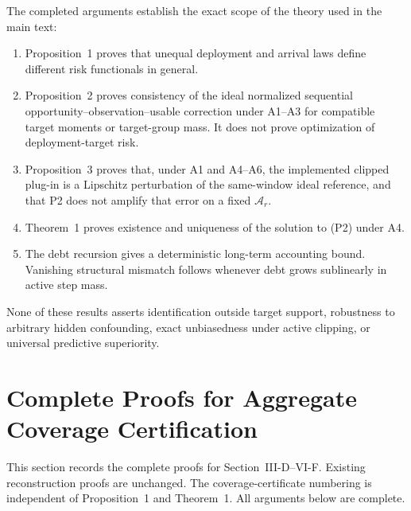 The completed arguments establish the exact scope of the theory used in
the main text:

\begin{enumerate}
    \item Proposition~1 proves that unequal deployment and arrival laws define
    different risk functionals in general.
    \item Proposition~2 proves consistency of the ideal normalized sequential
    opportunity--observation--usable correction under A1--A3 for compatible
    target moments or target-group mass.  It does not prove optimization of
    deployment-target risk.
    \item Proposition~3 proves that, under A1 and A4--A6, the implemented
    clipped plug-in is a Lipschitz perturbation of the same-window ideal
    reference, and that P2 does not amplify that error on a fixed
    $\mathcal{A}_r$.
    \item Theorem~1 proves existence and uniqueness of the solution to (P2)
    under A4.
    \item The debt recursion gives a deterministic long-term accounting bound.
    Vanishing structural mismatch follows whenever debt grows sublinearly in
    active step mass.
\end{enumerate}

None of these results asserts identification outside target support, robustness
to arbitrary hidden confounding, exact unbiasedness under active clipping, or
universal predictive superiority.


\section{Complete Proofs for Aggregate Coverage Certification}
\label{app:agg_coverage_proofs}

This section records the complete proofs for
Section~\mbox {III-D}--\mbox {VI-F}.
Existing reconstruction proofs are unchanged.  The coverage-certificate
numbering is independent of Proposition~1 and
Theorem~1.  All arguments below are complete.

